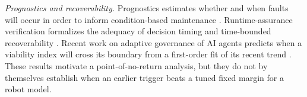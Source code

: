 \emph{Prognostics and recoverability.}  Prognostics estimates whether and when
faults will occur in order to inform condition-based maintenance
\cite{jardine2006prognostics}.  Runtime-assurance verification formalizes the
adequacy of decision timing and time-bounded recoverability
\cite{nigam2023recoverability}.  Recent work on adaptive governance of AI agents
predicts when a viability index will cross its boundary from a first-order fit
of its recent trend \cite{marin2026governance}.  These results motivate a
point-of-no-return analysis, but they do not by themselves establish when an
earlier trigger beats a tuned fixed margin for a robot model.
